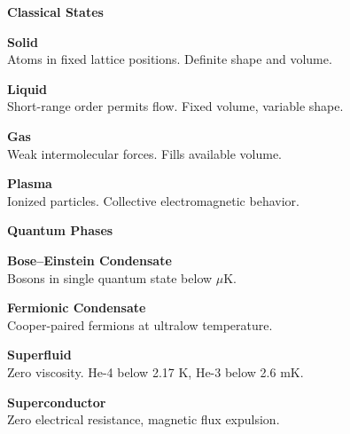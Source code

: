 \newpage
\thispagestyle{empty}

\begin{center}
\begin{tcolorbox}[
  enhanced,
  breakable,
  width=\textwidth,
  colframe=blue!60!black,
  colback=blue!5,
  colbacktitle=blue!60!black,
  coltitle=white,
  boxrule=0.5pt,
  arc=2mm,
  left=12pt,
  right=12pt,
  top=12pt,
  bottom=12pt,
  title=Phases of Matter,
  fonttitle=\bfseries\large,
  attach boxed title to top left={yshift=-2mm, xshift=5mm},
  boxed title style={arc=1mm, boxrule=0.5pt}
]

\begin{multicols}{2}
\raggedright
\small

\colorbox{blue!15}{\textbf{ Classical States}}\vspace{2pt}

\textbf{Solid}\\
{\footnotesize Atoms in fixed lattice positions. Definite shape and volume.}\vspace{4pt}

\textbf{Liquid}\\
{\footnotesize Short-range order permits flow. Fixed volume, variable shape.}\vspace{4pt}

\textbf{Gas}\\
{\footnotesize Weak intermolecular forces. Fills available volume.}\vspace{4pt}

\textbf{Plasma}\\
{\footnotesize Ionized particles. Collective electromagnetic behavior.}\vspace{8pt}

\colorbox{blue!15}{\textbf{ Quantum Phases}}\vspace{2pt}

\textbf{Bose–Einstein Condensate}\\
{\footnotesize Bosons in single quantum state below $\mu$K.}\vspace{4pt}

\textbf{Fermionic Condensate}\\
{\footnotesize Cooper-paired fermions at ultralow temperature.}\vspace{4pt}

\textbf{Superfluid}\\
{\footnotesize Zero viscosity. He-4 below 2.17 K, He-3 below 2.6 mK.}\vspace{4pt}

\textbf{Superconductor}\\
{\footnotesize Zero electrical resistance, magnetic flux expulsion.}\vspace{4pt}


\end{multicols}
\end{tcolorbox}
\end{center}
